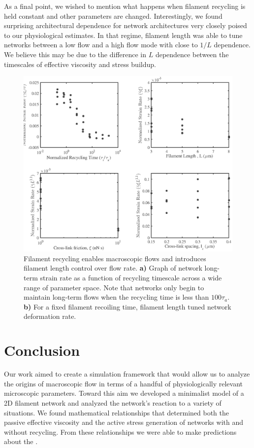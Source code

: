 \documentclass[10pt,letterpaper]{article}
\begin{document}
As a final point, we wished to mention what happens when filament recycling is held constant and other parameters are changed.  Interestingly, we found surprising architectural dependence for network architectures very closely poised to our physiological estimates.  In that regime, filament length was able to tune networks between a low flow and a high flow mode with close to $1/L$ dependence.  We believe this may be due to the difference in $L$ dependence between the timescales of effective viscosity and stress buildup. 
\begin{figure}[h!]
\centering
\includegraphics[width=\hsize]{figures/figure6b}
\caption{\label{fig:flow_form}  Filament recycling enables macroscopic flows and introduces filament length control over flow rate. \textbf{a)}  Graph of network long-term strain rate as a function of recycling timescale across a wide range of parameter space.  Note that networks only begin to maintain long-term flows when the recycling time is less than $100\tau_a$. \textbf{b)} For a fixed filament recoiling time, filament length tuned network deformation rate.}
\end{figure}








\section*{Conclusion}
Our work aimed to create a simulation framework that would allow us to analyze the origins of macroscopic flow in terms of a handful of physiologically relevant microscopic parameters.  Toward this aim we developed a minimalist model of a 2D filament network and analyzed the network's reaction to a variety of situations.  We found mathematical relationships that determined both the passive effective viscosity and the active stress generation of networks with and without recycling.  From these relationships we were able to make predictions about the .  
\end{document}
